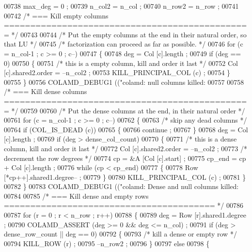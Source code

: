 \begin{DoxyCode}
{{{{{{{{{{{00738   max\_deg = 0 ;
00739   n\_col2 = n\_col ;
00740   n\_row2 = n\_row ;
00741 
00742   \textcolor{comment}{/* === Kill empty columns =============================================== */}
00743 
00744   \textcolor{comment}{/* Put the empty columns at the end in their natural order, so that LU */}
00745   \textcolor{comment}{/* factorization can proceed as far as possible. */}
00746   \textcolor{keywordflow}{for} (c = n\_col-1 ; c >= 0 ; c--)
00747   \{
00748     deg = Col [c].length ;
00749     \textcolor{keywordflow}{if} (deg == 0)
00750     \{
00751       \textcolor{comment}{/* this is a empty column, kill and order it last */}
00752       Col [c].shared2.order = --n\_col2 ;
00753       KILL\_PRINCIPAL\_COL (c) ;
00754     \}
00755   \}
00756   COLAMD\_DEBUG1 ((\textcolor{stringliteral}{"colamd: null columns killed: %
00757 
00758   \textcolor{comment}{/* === Kill dense columns =============================================== */}
00759 
00760   \textcolor{comment}{/* Put the dense columns at the end, in their natural order */}
00761   \textcolor{keywordflow}{for} (c = n\_col-1 ; c >= 0 ; c--)
00762   \{
00763     \textcolor{comment}{/* skip any dead columns */}
00764     \textcolor{keywordflow}{if} (COL\_IS\_DEAD (c))
00765     \{
00766       continue ;
00767     \}
00768     deg = Col [c].length ;
00769     \textcolor{keywordflow}{if} (deg > dense\_col\_count)
00770     \{
00771       \textcolor{comment}{/* this is a dense column, kill and order it last */}
00772       Col [c].shared2.order = --n\_col2 ;
00773       \textcolor{comment}{/* decrement the row degrees */}
00774       cp = &A [Col [c].start] ;
00775       cp\_end = cp + Col [c].length ;
00776       \textcolor{keywordflow}{while} (cp < cp\_end)
00777       \{
00778     Row [*cp++].shared1.degree-- ;
00779       \}
00780       KILL\_PRINCIPAL\_COL (c) ;
00781     \}
00782   \}
00783   COLAMD\_DEBUG1 ((\textcolor{stringliteral}{"colamd: Dense and null columns killed: %
00784 
00785   \textcolor{comment}{/* === Kill dense and empty rows ======================================== */}
00786 
00787   \textcolor{keywordflow}{for} (r = 0 ; r < n\_row ; r++)
00788   \{
00789     deg = Row [r].shared1.degree ;
00790     COLAMD\_ASSERT (deg >= 0 && deg <= n\_col) ;
00791     \textcolor{keywordflow}{if} (deg > dense\_row\_count || deg == 0)
00792     \{
00793       \textcolor{comment}{/* kill a dense or empty row */}
00794       KILL\_ROW (r) ;
00795       --n\_row2 ;
00796     \}
00797     \textcolor{keywordflow}{else}
00798     \{
}}}}}}}}}}}}}
\end{DoxyCode}
